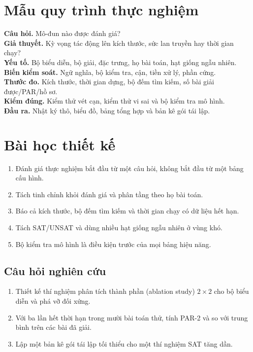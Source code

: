 \section{Mẫu quy trình thực nghiệm}

\begin{summarybox}
\textbf{Câu hỏi.} Mô-đun nào được đánh giá?\\
\textbf{Giả thuyết.} Kỳ vọng tác động lên kích thước, sức lan truyền hay thời gian chạy?\\
\textbf{Yếu tố.} Bộ biểu diễn, bộ giải, đặc trưng, họ bài toán, hạt giống ngẫu nhiên.\\
\textbf{Biến kiểm soát.} Ngữ nghĩa, bộ kiểm tra, cận, tiền xử lý, phần cứng.\\
\textbf{Thước đo.} Kích thước, thời gian dựng, bộ đếm tìm kiếm, số bài giải được/PAR/hồ sơ.\\
\textbf{Kiểm đúng.} Kiểm thử vét cạn, kiểm thử vi sai và bộ kiểm tra mô hình.\\
\textbf{Đầu ra.} Nhật ký thô, biểu đồ, bảng tổng hợp và bản kê gói tái lập.
\end{summarybox}

\section{Bài học thiết kế}

\begin{enumerate}
  \item Đánh giá thực nghiệm bắt đầu từ một câu hỏi, không bắt đầu từ một bảng cấu hình.
  \item Tách tinh chỉnh khỏi đánh giá và phân tầng theo họ bài toán.
  \item Báo cả kích thước, bộ đếm tìm kiếm và thời gian chạy có dữ liệu hết hạn.
  \item Tách SAT/UNSAT và dùng nhiều hạt giống ngẫu nhiên ở vùng khó.
  \item Bộ kiểm tra mô hình là điều kiện trước của mọi bảng hiệu năng.
\end{enumerate}

\subsection*{Câu hỏi nghiên cứu}
\begin{enumerate}
  \item Thiết kế thí nghiệm phân tích thành phần (ablation study) \(2\times2\) cho bộ biểu diễn và phá vỡ đối xứng.
  \item Với ba lần hết thời hạn trong mười bài toán thử, tính PAR-2 và so với
        trung bình trên các bài đã giải.
  \item Lập một bản kê gói tái lập tối thiểu cho một thí nghiệm SAT tăng dần.
\end{enumerate}
